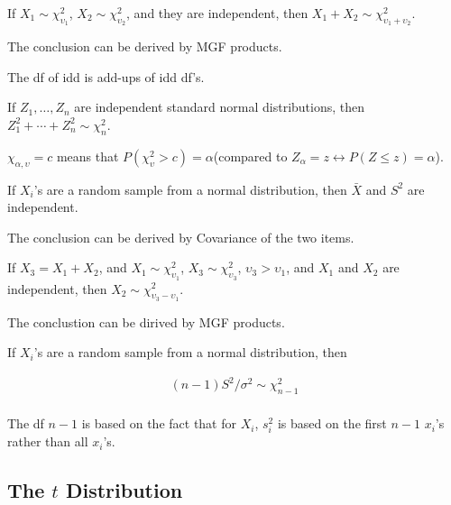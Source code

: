 \begin{proposition}
    If $X_1\sim \chi_{\upsilon_1}^2$, $X_2\sim \chi_{\upsilon_2}^2$, and they are independent, then $X_1 + X_2 \sim \chi_{\upsilon_1 + \upsilon_2}^2$.

    The conclusion can be derived by MGF products.
\end{proposition}

\begin{proposition}
    The df of idd is add-ups of idd df's.

    If $Z_1,\dots,Z_n$ are independent standard normal distributions, then $Z_1^2 + \cdots + Z_n^2 \sim \chi_n^2$.
\end{proposition}

$\chi_{\alpha,\upsilon} = c$ means that $P(\chi_\upsilon^2 > c) = \alpha$(compared to $Z_\alpha = z\leftrightarrow P(Z\leq z) = \alpha$).

\begin{proposition}
    If $X_i$'s are a random sample from a normal distribution, then $\bar{X}$ and $S^2$ are independent.

    The conclusion can be derived by Covariance of the two items. 
\end{proposition}

\begin{proposition}
    If $X_3 = X_1 + X_2$, and $X_1\sim \chi_{\upsilon_1}^2$, $X_3\sim\chi_{\upsilon_3}^2$, $\upsilon_3>\upsilon_1$, and $X_1$ and $X_2$ are independent, then $X_2\sim \chi_{\upsilon_3 - \upsilon_1}^2$.

    The conclustion can be dirived by MGF products.
\end{proposition}

\begin{proposition}
    If $X_i$'s are a random sample from a normal distribution, then 
    
    \begin{align*}
        (n-1)S^2/\sigma^2\sim \chi_{n-1}^2 \\
    \end{align*}

    The df $n-1$ is based on the fact that for $X_i$, $s_i^2$ is based on the first $n-1$ $x_i$'s rather than all $x_i$'s.
\end{proposition}

\subsection{The $t$ Distribution}

